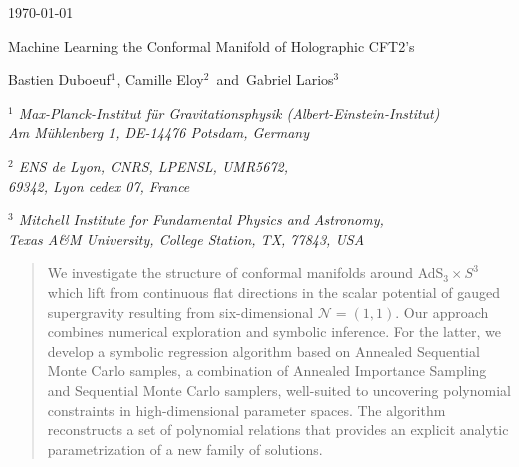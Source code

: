\documentclass[11pt,a4paper]{article}
\begin{document}
\begin{titlepage}



\begin{flushright}

\today
\end{flushright}


\vspace{25pt}

   
   \begin{center}
   \baselineskip=16pt

{\Large Machine Learning the Conformal Manifold of Holographic CFT2’s}


   		
\vspace{25pt}
		

{\large  Bastien Duboeuf$^{1}$, Camille Eloy$^{2}$ \,and\, Gabriel Larios$^{3}$}
		
\vspace{25pt}
		
		
	\begin{small}

	{\it $^{1}$ Max-Planck-Institut f\"ur Gravitationsphysik (Albert-Einstein-Institut)\\ Am M\"uhlenberg 1, DE-14476 Potsdam, Germany}  \\

	\vspace{10pt}

	{\it $^{2}$ ENS de Lyon, CNRS, LPENSL, UMR5672,\\ 69342, Lyon cedex 07, France}  \\


	\vspace{10pt}
	
	{\it $^{3}$ Mitchell Institute for Fundamental Physics and Astronomy, \\
	Texas A\&M University, College Station, TX, 77843, USA}     \\
		
	\end{small}
		

\vskip 50pt

\end{center}

\begin{abstract}
	We investigate the structure of conformal manifolds around AdS$_3 \times S^3$ which lift from continuous flat directions in the scalar potential of gauged supergravity resulting from six-dimensional $\mathcal{N}=(1,1)$.
	Our approach combines numerical exploration and symbolic inference. For the latter, we develop a symbolic regression algorithm based on Annealed Sequential Monte Carlo samples, a combination of Annealed Importance Sampling and Sequential Monte Carlo samplers, well-suited to uncovering polynomial constraints in high-dimensional parameter spaces. 
	The algorithm reconstructs a set of polynomial relations that provides an explicit analytic parametrization of a new family of solutions. 
\end{abstract}


\vfill

\end{titlepage}
\end{document}
